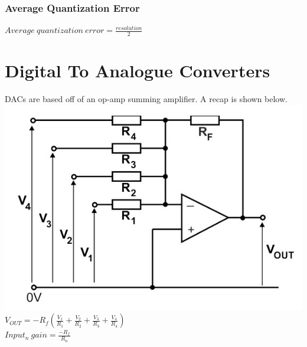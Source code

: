 \documentclass[a4paper,11pt, twocolumn]{article}
\begin{document}
\subsubsection{Average Quantization Error}
$\displaystyle Average\ quantization\ error = \frac{resolution}{2}$

\section{Digital To Analogue Converters}
DACs are based off of an op-amp summing amplifier. A recap is shown below.
\includegraphics[width=\linewidth]{op-ampSumming.jpg}
$\displaystyle V_{OUT} = -R_{f} \left(\displaystyle \frac{V_1}{R_1} + \frac{V_2}{R_2} + \frac{V_3}{R_3} + \frac{V_4}{R_4} \right)$\\
$\displaystyle Input_n\ gain = \frac{-R_f}{R_{n}}$
\end{document}
